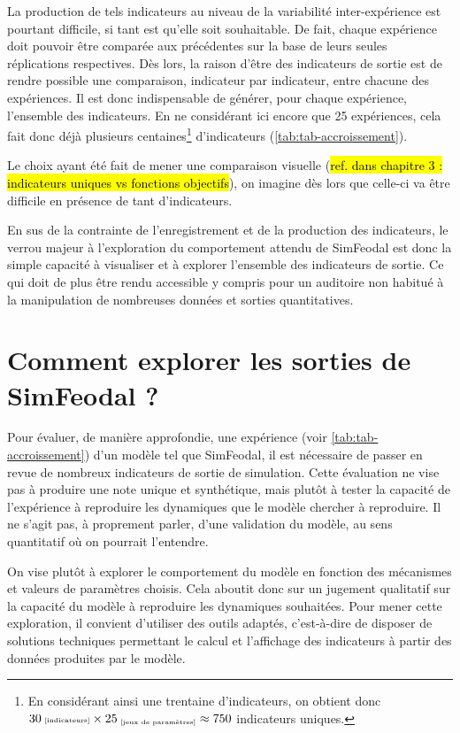 La production de tels indicateurs au niveau de la variabilité inter-expérience est pourtant difficile, si tant est qu'elle soit souhaitable.
De fait, chaque expérience doit pouvoir être comparée aux précédentes sur la base de leurs seules réplications respectives.
Dès lors, la raison d'être des indicateurs de sortie est de rendre possible une comparaison, indicateur par indicateur, entre chacune des expériences.
Il est donc indispensable de générer, pour chaque expérience, l'ensemble des indicateurs. En ne considérant ici encore que 25 expériences, cela fait donc déjà plusieurs centaines\footnote{
	En considérant ainsi une trentaine d'indicateurs, on obtient donc $30{\text{\tiny ~[indicateurs]}} \times 25_{\text{\tiny ~[jeux de paramètres]}} \approx 750$ indicateurs uniques.
} d'indicateurs (\cref{tab:tab-accroissement}).

Le choix ayant été fait de mener une comparaison visuelle (\hl{ref. dans chapitre 3 : indicateurs uniques vs fonctions objectifs}), on imagine dès lors que celle-ci va être difficile en présence de tant d'indicateurs.

En sus de la contrainte de l'enregistrement et de la production des indicateurs, le verrou majeur à l'exploration du comportement attendu de SimFeodal est donc la simple capacité à visualiser et à explorer l'ensemble des indicateurs de sortie.
Ce qui doit de plus être rendu accessible y compris pour un auditoire non habitué à la manipulation de nombreuses données et sorties quantitatives.

\clearpage
\section[Comment explorer les sorties de SimFeodal ?]{Comment explorer les sorties de SimFeodal ?%
	}\label{sec:explorer-sorties-simfeodal}

Pour évaluer, de manière approfondie, une expérience (voir \cref{tab:tab-accroissement}) d'un modèle tel que SimFeodal, il est nécessaire de passer en revue de nombreux indicateurs de sortie de simulation.
Cette évaluation ne vise pas à produire une \og note\fg{} unique et synthétique, mais plutôt à tester la capacité de l'expérience à reproduire les dynamiques que le modèle chercher à reproduire.
Il ne s'agit pas, à proprement parler, d'une validation du modèle, au sens quantitatif où on pourrait l'entendre.

On vise plutôt à explorer le comportement du modèle en fonction des mécanismes et valeurs de paramètres choisis.
Cela aboutit donc sur un jugement qualitatif sur la capacité du modèle à reproduire les dynamiques souhaitées.
Pour mener cette exploration, il convient d'utiliser des outils adaptés, c'est-à-dire de disposer de solutions techniques permettant le calcul et l'affichage des indicateurs à partir des données produites par le modèle.

